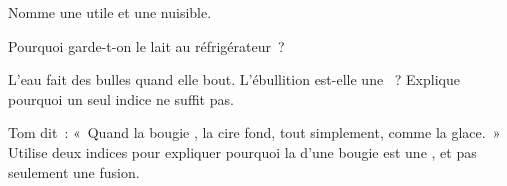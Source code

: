 \begin{exercise}[$\star$]\label{exo:g5:irreversible-changes:8}
Nomme une  utile et une 
nuisible.
\end{exercise}

\begin{exercise}[$\star$]\label{exo:g5:irreversible-changes:9}
Pourquoi garde-t-on le lait au réfrigérateur~?
\end{exercise}

\begin{exercise}[$\star\star$]\label{exo:g5:irreversible-changes:10}
L'eau fait des bulles quand elle bout. L'ébullition est-elle une
~? Explique pourquoi un seul indice ne suffit
pas.
\end{exercise}

\begin{exercise}[$\star\star$]\label{exo:g5:irreversible-changes:11}
Tom dit~: «~Quand la bougie , la cire fond, tout simplement, comme
la glace.~» Utilise deux indices pour expliquer pourquoi la 
d'une bougie est une , et pas seulement une
fusion.
\end{exercise}
